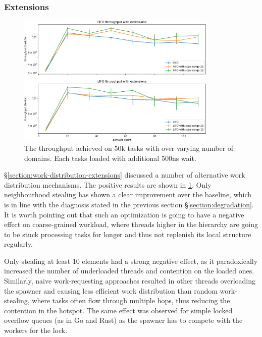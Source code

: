 \documentclass[12pt,a4paper,twoside]{report}
\begin{document}
\subsubsection{Extensions}
\label{section:extensions}



\begin{figure} 
     \centering
     \includegraphics[width=0.85\textwidth]{eval/packet-basic-distribution10-granular.png}
     \caption{The throughput achieved on 50k tasks with over varying number of domains. Each tasks loaded with additional 500ns wait.}
    \label{fig:packet-extenstions}
\end{figure}


\S\ref{section:work-distribution-extensions} discussed a number of alternative work distribution mechanisms. The positive results are shown in \ref{fig:packet-extenstions}. Only neighbourhood stealing has shown a clear improvement over the baseline, which is in line with the diagnosis stated in the previous section \S\ref{section:degradation}. It is worth pointing out that such an optimization is going to have a negative effect on coarse-grained workload, where threads higher in the hierarchy are going to be stuck processing tasks for longer and thus not replenish its local structure regularly. 

\label{paragraph:overflow-queue-bad-1}
Only stealing at least 10 elements had a strong negative effect, as it paradoxically increased the number of underloaded threads and contention on the loaded ones. Similarly, naive work-requesting approaches resulted in other threads overloading the spawner and causing less efficient work distribution than random work-stealing, where tasks often flow through multiple hops, thus reducing the contention in the hotspot. The same effect was observed for simple locked overflow queues (as in Go and Rust) as the spawner has to compete with the workers for the lock.
\end{document}
